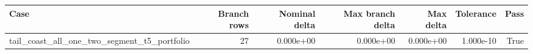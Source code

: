 \begin{tabular}{lrrrrrr}
\toprule
Case & Branch rows & Nominal delta & Max branch delta & Max delta & Tolerance & Pass \\
\midrule
tail\_coast\_all\_one\_two\_segment\_t5\_portfolio & 27 & 0.000e+00 & 0.000e+00 & 0.000e+00 & 1.000e-10 & True \\
\bottomrule
\end{tabular}

